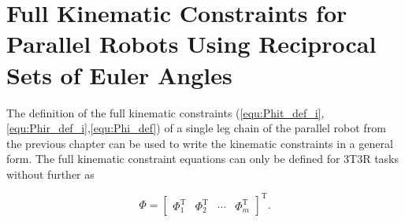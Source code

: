 \documentclass[robotics,article,accept,moreauthors,pdftex]{Definitions/mdpi}
\newcommand{\bm}[1]{\boldsymbol{#1}}
\newcommand{\transp}[0]{{\mathrm{T}}}
\let\Phi\varPhi
\begin{document}
\section{Full Kinematic Constraints for Parallel Robots Using Reciprocal Sets of Euler Angles}
\label{sec:ZB_PKM}

The definition of the full kinematic constraints (\ref{equ:Phit_def_i},\ref{equ:Phir_def_i},\ref{equ:Phi_def}) of a single leg chain of the parallel robot from the previous chapter can be used to write the kinematic constraints
in a general form.
%
The full kinematic constraint equations can only be defined for 3T3R tasks without further  as


\begin{equation}
\bm{\Phi}
=
\begin{bmatrix}
\bm{\Phi}_1^\transp &
\bm{\Phi}_2^\transp &
\cdots &
\bm{\Phi}_m^\transp
\end{bmatrix}^\transp.
\label{equ:constr_Phi_PKM}
\end{equation}
%
\end{document}
